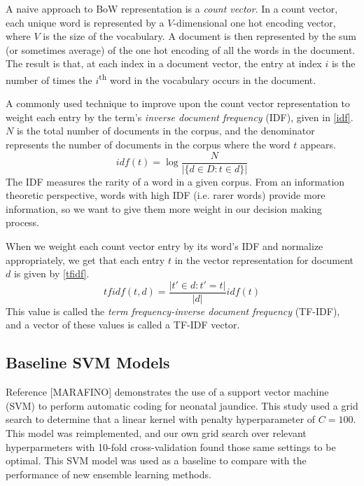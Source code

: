 \documentclass[conference]{IEEEtran}
\begin{document}
A naive approach to BoW representation is a \textit{count vector}. In a count vector, each unique word is represented by a $V$-dimensional one hot encoding vector, where $V$ is the size of the vocabulary. A document is then represented by the sum (or sometimes average) of the one hot encoding of all the words in the document. The result is that, at each index in a document vector, the entry at index $i$ is the number of times the $i$\textsuperscript{th} word in the vocabulary occurs in the document.

A commonly used technique to improve upon the count vector representation to weight each entry by the term's \textit{inverse document frequency} (IDF), given in \eqref{idf}. $N$ is the total number of documents in the corpus, and the denominator represents the number of documents in the corpus where the word $t$ appears.
\begin{equation}
idf(t) = \log \frac{N}{|\{d \in D : t \in d\} |}\label{idf}
\end{equation}
The IDF measures the rarity of a word in a given corpus. From an information theoretic perspective, words with high IDF (i.e. rarer words) provide more information, so we want to give them more weight in our decision making process.

When we weight each count vector entry by its word's IDF and normalize appropriately, we get that each entry $t$ in the vector representation for document $d$ is given by \eqref{tfidf}.
\begin{equation}
tfidf(t, d) = \frac{|t' \in d : t' = t|}{|d|} idf(t)\label{tfidf}
\end{equation}
This value is called the \textit{term frequency-inverse document frequency} (TF-IDF), and a vector of these values is called a TF-IDF vector.

\subsection{Baseline SVM Models}\label{AA}
Reference [MARAFINO] demonstrates the use of a support vector machine (SVM) to perform automatic coding for neonatal jaundice. This study used a grid search to determine that a linear kernel with penalty hyperparameter of $C = 100$. This model was reimplemented, and our own grid search over relevant hyperparmeters with 10-fold cross-validation found those same settings to be optimal. This SVM model was used as a baseline to compare with the performance of new ensemble learning methods. 
\end{document}
